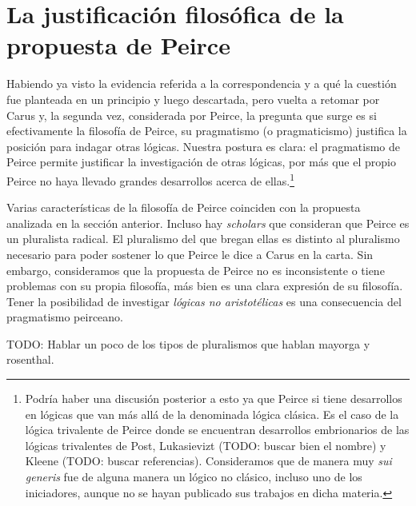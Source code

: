 \documentclass[
  structure  = article,
  pagelayout = periodicalaureo,%
  secfont    = italic,
  subsecfont = italic,
  version    = final,%
]{suftesi}
\begin{document}

\section{La justificación filosófica de la propuesta de Peirce} %
\label{sec:La justificación filosófica de la propuesta de Peirce}

Habiendo ya visto la evidencia referida a la correspondencia y a qué la cuestión fue planteada en un principio y luego descartada, pero vuelta a retomar por Carus y, la segunda vez, considerada por Peirce, la pregunta que surge es si efectivamente la filosofía de Peirce, su pragmatismo (o pragmaticismo) justifica la posición para indagar otras lógicas. Nuestra postura es clara: el pragmatismo de Peirce permite justificar la investigación de otras lógicas, por más que el propio Peirce no haya llevado grandes desarrollos acerca de ellas.\footnote{Podría haber una discusión posterior a esto ya que Peirce si tiene desarrollos en lógicas que van más allá de la denominada lógica clásica. Es el caso de la lógica trivalente de Peirce \cite{fisch1966, turquette1967, turquette1969, lane1999, odland2021} donde se encuentran desarrollos embrionarios de las lógicas trivalentes de Post, Lukasievizt (TODO: buscar bien el nombre) y Kleene (TODO: buscar referencias). Consideramos que de manera muy \emph{sui generis} fue de alguna manera un lógico no clásico, incluso uno de los iniciadores, aunque no se hayan publicado sus trabajos en dicha materia.}

Varias características de la filosofía de Peirce coinciden con la propuesta analizada en la sección anterior. Incluso hay \emph{scholars} que consideran que Peirce es un pluralista radical\cite{mayorga2016, rosenthal1994}. El pluralismo del que bregan ellas es distinto al pluralismo necesario para poder sostener lo que Peirce le dice a Carus en la carta. Sin embargo, consideramos que la propuesta de Peirce no es inconsistente o tiene problemas con su propia filosofía, más bien es una clara expresión de su filosofía. Tener la posibilidad de investigar \emph{lógicas no aristotélicas} es una consecuencia del pragmatismo peirceano.

TODO: Hablar un poco de los tipos de pluralismos que hablan mayorga y rosenthal.
\end{document}
